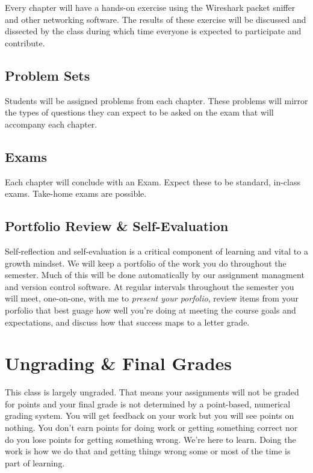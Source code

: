 \documentclass[10pt]{article}
\begin{document}
Every chapter will have a hands-on exercise using the Wireshark packet sniffer and other networking software. The results of these exercise will be discussed and dissected by the class during which time everyone is expected to participate and contribute.


\subsection*{Problem Sets}

Students will be assigned problems from each chapter. These problems will mirror the types of questions they can expect to be asked on the exam that will accompany each chapter. 

\subsection*{Exams}

Each chapter will conclude with an Exam. Expect these to be standard, in-class exams. Take-home exams are possible. 

\subsection*{Portfolio Review \& Self-Evaluation}

Self-reflection and self-evaluation is a critical component of learning and vital to a growth mindset.
We will keep a portfolio of the work you do throughout the semester. Much of this will be done automatically
by our assignment managment and version control software. At regular intervals throughout the semester you will
meet, one-on-one, with me to \textit{present your porfolio}, review items from your porfolio that best 
guage how well you're doing at meeting the course goals and expectations, and discuss how that success maps to 
a letter grade.  


\section{Ungrading \& Final Grades}

This class is largely ungraded. That means your assignments will not be graded for points and your final grade
is not determined by a point-based, numerical grading system. You will get feedback on your work but you will
see points on nothing. You don't earn points for doing work or getting something correct nor do you lose points
for getting something wrong. We're here to learn. Doing the work is how we do that and getting things wrong
some or most of the time is part of learning.
\end{document}
